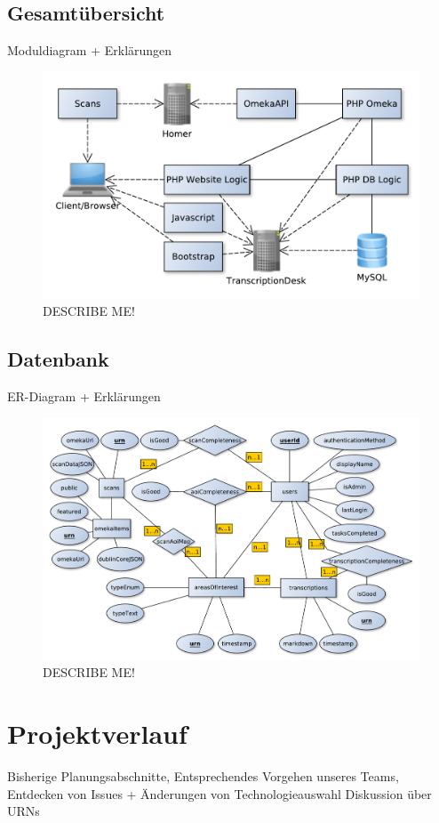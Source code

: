 \documentclass{article}
\begin{document}
\subsection{Gesamtübersicht}
Moduldiagram + Erklärungen
\\\begin{figure}
\includegraphics[width=\textwidth]{notes/components.pdf}
\caption{DESCRIBE ME!}
\label{fig:components}
\end{figure}

\subsection{Datenbank}
ER-Diagram + Erklärungen
\\\begin{figure}
\includegraphics[width=\textwidth]{notes/ER.pdf}
\caption{DESCRIBE ME!}
\label{fig:er}
\end{figure}

\section{Projektverlauf}
Bisherige Planungsabschnitte,
Entsprechendes Vorgehen unseres Teams,
Entdecken von Issues + Änderungen von Technologieauswahl
Diskussion über URNs
\end{document}

